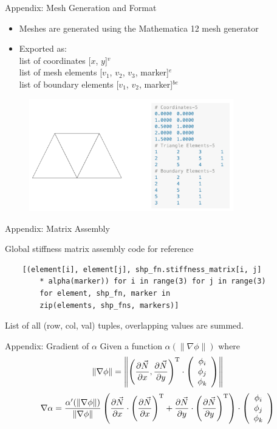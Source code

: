 \documentclass{beamer}
\newcommand\norm[1]{\left\lVert#1\right\rVert}
\begin{document}
    \begin{frame}{Appendix: Mesh Generation and Format}
        \begin{itemize}
            \item Meshes are generated using the Mathematica 12 mesh generator
            \item Exported as:\\ list of coordinates [$x$, $y$]$^v$ \\list of mesh elements [$v_1$, $v_2$, $v_3$, marker]$^{e}$ \\list of boundary elements [$v_1$, $v_2$, marker]$^{be}$
        \end{itemize}


        \begin{figure}
            \centering
            \includegraphics[width=3.5in]{meshdemo.png}
        \end{figure}
    \end{frame}
    \begin{frame}[fragile]{Appendix: Matrix Assembly}

        Global stiffness matrix assembly code for reference
        {\small
        \begin{verbatim}
    [(element[i], element[j], shp_fn.stiffness_matrix[i, j]
        * alpha(marker)) for i in range(3) for j in range(3)
        for element, shp_fn, marker in
        zip(elements, shp_fns, markers)]
        \end{verbatim}}
        List of all (row, col, val) tuples, overlapping values are summed.
    \end{frame}
    \begin{frame}[fragile]{Appendix: Gradient of $\alpha$}
        Given a function $\alpha(\|\nabla\phi\|)$ where
        \[\norm{\nabla\phi}=\norm{\left(\pdv{\vec{N}}{x}, \pdv{\vec{N}}{y} \right)^{\text{T}}\cdot \left(
        \begin{array}{c}
            \phi _i \\
            \phi _j \\
            \phi _k \\
        \end{array}
        \right)}\]
        \[\nabla\alpha=\frac{\alpha'(\norm{\nabla\phi})}{\norm{\nabla\phi}}
        \left(\pdv{\vec{N}}{x}\cdot\left(\pdv{\vec{N}}{x}\right)^{\text{T}}+
        \pdv{\vec{N}}{y}\cdot\left(\pdv{\vec{N}}{y}\right)^{\text{T}}\right)\cdot \left(
        \begin{array}{c}
            \phi _i \\
            \phi _j \\
            \phi _k \\
        \end{array}
        \right)\]
    \end{frame}
\end{document}
